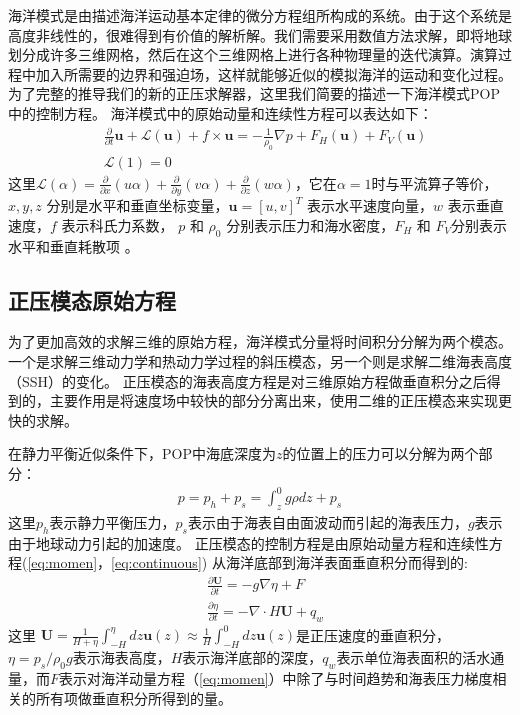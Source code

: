 海洋模式是由描述海洋运动基本定律的微分方程组所构成的系统。由于这个系统是高度非线性的，很难得到有价值的解析解。我们需要采用数值方法求解，即将地球划分成许多三维网格，然后在这个三维网格上进行各种物理量的迭代演算。演算过程中加入所需要的边界和强迫场，这样就能够近似的模拟海洋的运动和变化过程。
为了完整的推导我们的新的正压求解器，这里我们简要的描述一下海洋模式POP中的控制方程。
海洋模式中的原始动量和连续性方程可以表达如下：
\begin{align}
&\frac{\partial }{\partial t} \textbf{u} +\mathcal{L}(\textbf{u}) + f\times \textbf{u} = - \frac{1}{\rho_0}\nabla p +F_H(\textbf{u}) +F_V(\textbf{u}) \label{eq:momen}\\
&\mathcal{L}(1) = 0 \label{eq:continuous}
\end{align}
这里$\mathcal{L}(\alpha ) = \frac{\partial }{\partial x} (u\alpha)  +\frac{\partial }{\partial y} (v\alpha) +\frac{\partial }{\partial z} (w\alpha)$，它在$\alpha =1$时与平流算子等价，$x, y, z$ 分别是水平和垂直坐标变量，$\textbf{u} = [u, v]^T$ 表示水平速度向量，$w$ 表示垂直速度，$f$ 表示科氏力系数， $p$ 和 $\rho_0$ 分别表示压力和海水密度，$F_H$ 和 $F_V$分别表示水平和垂直耗散项 \cite{smith2010parallel}。  


\subsection{正压模态原始方程} \label{solver:mode}

为了更加高效的求解三维的原始方程，海洋模式分量将时间积分分解为两个模态。 一个是求解三维动力学和热动力学过程的斜压模态，另一个则是求解二维海表高度（SSH）的变化。
正压模态的海表高度方程是对三维原始方程做垂直积分之后得到的，主要作用是将速度场中较快的部分分离出来，使用二维的正压模态来实现更快的求解。

在静力平衡近似条件下，POP中海底深度为$z$的位置上的压力可以分解为两个部分：  
\begin{align}
\displaystyle p = p_h + p_s = \int^0_z g\rho dz +p_s
\end{align}
这里$p_h$表示静力平衡压力，$p_s$表示由于海表自由面波动而引起的海表压力，$g$表示由于地球动力引起的加速度。 
正压模态的控制方程是由原始动量方程和连续性方程(\ref{eq:momen}，\ref{eq:continuous}) 从海洋底部到海洋表面垂直积分而得到的:
\begin{align}
&\displaystyle \frac{\partial \textbf{U} }{\partial t}  = -g \nabla \eta + F  \label{eq:baro_mon}\\
&\displaystyle \frac{\partial \eta }{\partial t} = - \nabla \cdot H\textbf{U} + q_w  \label{eq:baro_con}
\end{align}
这里  $\textbf{U} =  \frac{1}{H+\eta}\int_{-H}^\eta dz \textbf{u}(z) \approx \frac{1}{H }\int_{-H}^0 dz \textbf{u}(z)$是正压速度的垂直积分，
$\eta = p_s/{\rho_0g}$表示海表高度，$H$表示海洋底部的深度，$q_w$表示单位海表面积的活水通量，而$F$表示对海洋动量方程（\ref{eq:momen}）中除了与时间趋势和海表压力梯度相关的所有项做垂直积分所得到的量。
 
